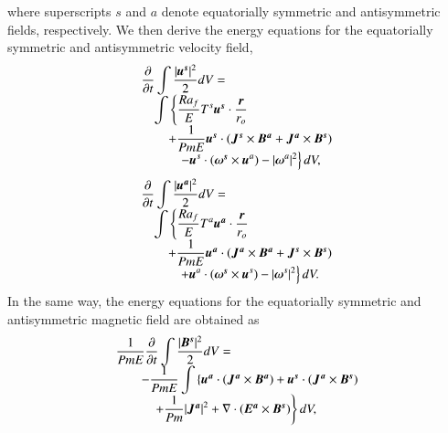 %
where superscripts $s$ and $a$ denote equatorially symmetric and antisymmetric fields, respectively.
We then derive the energy equations for the equatorially symmetric and antisymmetric velocity field,
%
\begin{equation}
\begin{array}{l}
\displaystyle
\frac{\partial}{\partial t}
 \int \frac{|\mbox{\boldmath$u^s$}|^2}{2} d V =
\nonumber \\
\displaystyle
\hspace*{1em}
\int \left\{
      \frac{Ra_f}{E}T^s \mbox{\boldmath$u^s$}\cdot \frac{\mbox{\boldmath$r$}}{r_{o}}
     \right.
\nonumber \\
\displaystyle
\hspace*{2em}
     \left.
    + \frac{1}{Pm E} \mbox{\boldmath$u^s$} \cdot
                (\mbox{\boldmath$J^s$} \times \mbox{\boldmath$B^a$}
                +\mbox{\boldmath$J^a$} \times \mbox{\boldmath$B^s$})
      \right.
\nonumber \\
\displaystyle
\hspace*{3em}
      \left.
    - \mbox{\boldmath$u$}^s \cdot 
       (\mbox{\boldmath$\omega^s$} \times \mbox{\boldmath$u$}^a)
    - |\mbox{\boldmath$\omega$}^a|^2 
      \right\} d V,
\end{array}
\label{eq:energy_us}
\end{equation}
%
\begin{equation}
\begin{array}{l}
\displaystyle
\frac{\partial}{\partial t}
 \int \frac{|\mbox{\boldmath$u^a$}|^2}{2} d V =
\nonumber \\
\displaystyle
\hspace*{1em}
\int \left\{
      \frac{Ra_f}{E}T^a \mbox{\boldmath$u^a$}\cdot \frac{\mbox{\boldmath$r$}}{r_{o}}
     \right.
\nonumber \\
\displaystyle
\hspace*{2em}
     \left.
    + \frac{1}{Pm E} \mbox{\boldmath$u^a$} \cdot
                (\mbox{\boldmath$J^a$} \times \mbox{\boldmath$B^a$}
                +\mbox{\boldmath$J^s$} \times \mbox{\boldmath$B^s$})
      \right.
\nonumber \\
\displaystyle
\hspace*{3em}
      \left.
    + \mbox{\boldmath$u$}^a \cdot 
       (\mbox{\boldmath$\omega^s$} \times \mbox{\boldmath$u$}^s)
    - |\mbox{\boldmath$\omega$}^s|^2 
      \right\} d V.
\end{array}
\label{eq:energy_ua}
\end{equation}
%
In the same way, the energy equations for the equatorially symmetric and antisymmetric magnetic field are obtained as
%
\begin{equation}
\begin{array}{l}
\displaystyle
\frac{1}{Pm E}\frac{\partial}{\partial t}
 \int \frac{|\mbox{\boldmath$B^s$}|^2}{2} d V =
\nonumber \\
\hspace*{2em}
\displaystyle
- \frac{1}{Pm E}\int \left\{
      \mbox{\boldmath$u^a$} \cdot 
          ( \mbox{\boldmath$J^a$} \times \mbox{\boldmath$B^a$} )
    + \mbox{\boldmath$u^s$} \cdot 
          ( \mbox{\boldmath$J^a$} \times \mbox{\boldmath$B^s$} )
    \right.
\nonumber \\
\hspace{3em}
\displaystyle
    \left.
    + \frac{1}{Pm} |\mbox{\boldmath$J^a$}|^2
    + \nabla \cdot ( \mbox{\boldmath$E^a$} \times \mbox{\boldmath$B^s$} ) 
      \right\} d V,
\end{array}
\label{eq:energy_Bs}
\end{equation}
